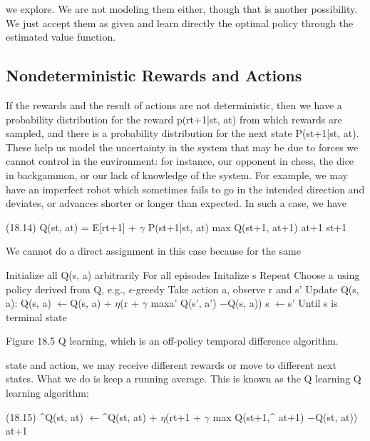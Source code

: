 we explore. We are not modeling them either, though that is another possibility. We just accept them as given and learn directly the optimal policy through the estimated value function.

\subsection{Nondeterministic Rewards and Actions}

If the rewards and the result of actions are not deterministic, then we have a probability distribution for the reward p(rt+1|st, at) from which rewards are sampled, and there is a probability distribution for the next state P(st+1|st, at). These help us model the uncertainty in the system that may be due to forces we cannot control in the environment: for instance, our opponent in chess, the dice in backgammon, or our lack of knowledge of the system. For example, we may have an imperfect robot which sometimes fails to go in the intended direction and deviates, or advances shorter or longer than expected. In such a case, we have

(18.14) Q(st, at) = E[rt+1] + $\gamma$ P(st+1|st, at) max Q(st+1, at+1) at+1 st+1

We cannot do a direct assignment in this case because for the same

Initialize all Q(s, a) arbitrarily For all episodes Initalize s Repeat Choose a using policy derived from Q, e.g., $\epsilon$-greedy Take action a, observe r and s' Update Q(s, a): Q(s, a) $\leftarrow$Q(s, a) + $\eta$(r + $\gamma$ maxa' Q(s', a') $-$Q(s, a)) s $\leftarrow$s' Until s is terminal state

Figure 18.5 Q learning, which is an off-policy temporal difference algorithm.

state and action, we may receive different rewards or move to different next states. What we do is keep a running average. This is known as the Q learning Q learning algorithm:

(18.15) \textasciicircum{}Q(st, at) $\leftarrow$\textasciicircum{}Q(st, at) + $\eta$(rt+1 + $\gamma$ max Q(st+1,\textasciicircum{} at+1) $-$Q(st, at)) at+1

